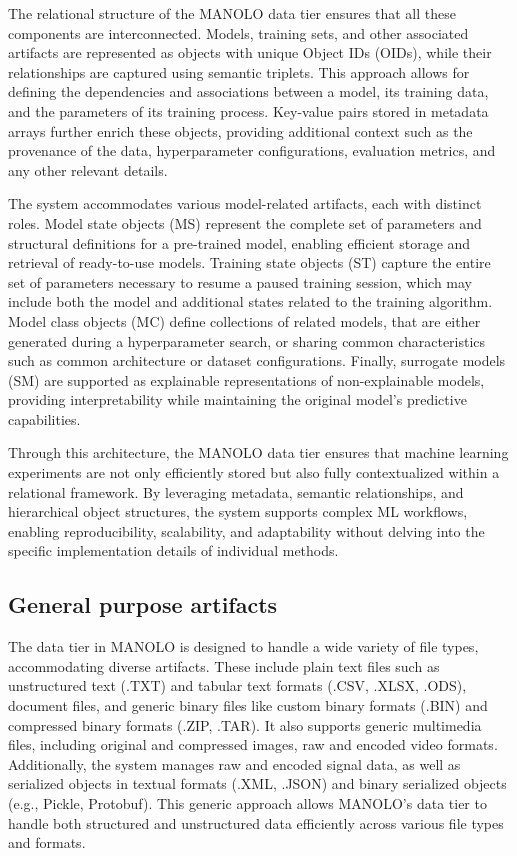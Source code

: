 The relational structure of the MANOLO data tier ensures that all these components are interconnected. Models, training sets, and other associated artifacts are represented as objects with unique Object IDs (OIDs), while their relationships are captured using semantic triplets. This approach allows for defining the dependencies and associations between a model, its training data, and the parameters of its training process. Key-value pairs stored in metadata arrays further enrich these objects, providing additional context such as the provenance of the data, hyperparameter configurations, evaluation metrics, and any other relevant details.

The system accommodates various model-related artifacts, each with distinct roles. Model state objects (MS) represent the complete set of parameters and structural definitions for a pre-trained model, enabling efficient storage and retrieval of ready-to-use models. Training state objects (ST) capture the entire set of parameters necessary to resume a paused training session, which may include both the model and additional states related to the training algorithm. Model class objects (MC) define collections of related models, that are either generated during a hyperparameter search, or sharing common characteristics such as common architecture or dataset configurations. Finally, surrogate models (SM) are supported as explainable representations of non-explainable models, providing interpretability while maintaining the original model's predictive capabilities.

Through this architecture, the MANOLO data tier ensures that machine learning experiments are not only efficiently stored but also fully contextualized within a relational framework. By leveraging metadata, semantic relationships, and hierarchical object structures, the system supports complex ML workflows, enabling reproducibility, scalability, and adaptability without delving into the specific implementation details of individual methods.

\subsection{General purpose artifacts}
The data tier in MANOLO is designed to handle a wide variety of file types, accommodating diverse artifacts. These include plain text files such as unstructured text (.TXT) and tabular text formats (.CSV, .XLSX, .ODS), document files, and generic binary files like custom binary formats (.BIN) and compressed binary formats (.ZIP, .TAR). It also supports generic multimedia files, including original and compressed images, raw and encoded video formats. Additionally, the system manages raw and encoded signal data, as well as serialized objects in textual formats (.XML, .JSON) and binary serialized objects (e.g., Pickle, Protobuf). This generic approach allows MANOLO's data tier to handle both structured and unstructured data efficiently across various file types and formats.

